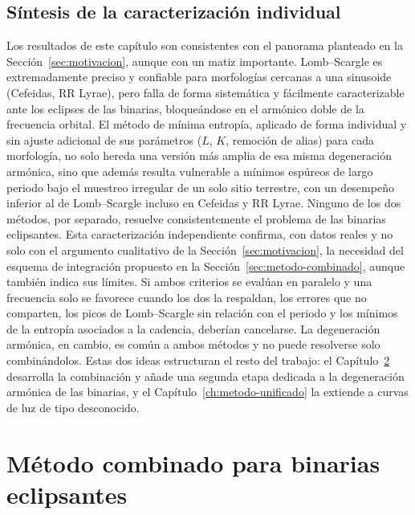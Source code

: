 \documentclass[12pt,letterpaper,oneside]{book}
\begin{document}
\section{S\'intesis de la caracterizaci\'on individual}
\label{sec:sintesis-resultados}

Los resultados de este cap\'itulo son consistentes con el panorama planteado en la Secci\'on~\ref{sec:motivacion}, aunque con un matiz importante. Lomb--Scargle es extremadamente preciso y confiable para morfolog\'ias cercanas a una sinusoide (Cefeidas, RR Lyrae), pero falla de forma sistem\'atica y f\'acilmente caracterizable ante los eclipses de las binarias, bloque\'andose en el arm\'onico doble de la frecuencia orbital. El m\'etodo de m\'inima entrop\'ia, aplicado de forma individual y sin ajuste adicional de sus par\'ametros ($L$, $K$, remoci\'on de alias) para cada morfolog\'ia, no solo hereda una versi\'on m\'as amplia de esa misma degeneraci\'on arm\'onica, sino que adem\'as resulta vulnerable a m\'inimos esp\'ureos de largo periodo bajo el muestreo irregular de un solo sitio terrestre, con un desempe\~no inferior al de Lomb--Scargle incluso en Cefeidas y RR Lyrae. Ninguno de los dos m\'etodos, por separado, resuelve consistentemente el problema de las binarias eclipsantes. Esta caracterizaci\'on independiente confirma, con datos reales y no solo con el argumento cualitativo de la Secci\'on~\ref{sec:motivacion}, la necesidad del esquema de integraci\'on propuesto en la Secci\'on~\ref{sec:metodo-combinado}, aunque tambi\'en indica sus l\'imites. Si ambos criterios se eval\'uan en paralelo y una frecuencia solo se favorece cuando los dos la respaldan, los errores que no comparten, los picos de Lomb--Scargle sin relaci\'on con el periodo y los m\'inimos de la entrop\'ia asociados a la cadencia, deber\'ian cancelarse. La degeneraci\'on arm\'onica, en cambio, es com\'un a ambos m\'etodos y no puede resolverse solo combin\'andolos. Estas dos ideas estructuran el resto del trabajo: el Cap\'itulo~\ref{ch:metodo-hibrido} desarrolla la combinaci\'on y a\~nade una segunda etapa dedicada a la degeneraci\'on arm\'onica de las binarias, y el Cap\'itulo~\ref{ch:metodo-unificado} la extiende a curvas de luz de tipo desconocido.


\chapter{M\'etodo combinado para binarias eclipsantes}
\label{ch:metodo-hibrido}
\end{document}
